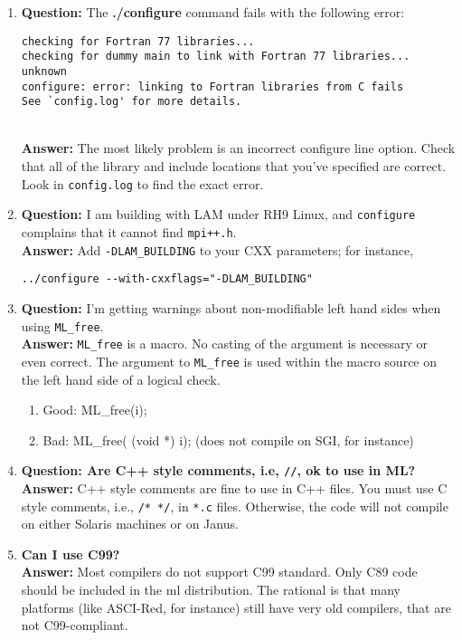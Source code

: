 \documentclass[10pt,letter,relax]{SANDreport}
\newcommand{\ML}     {{\sc ml }}
\begin{document}
\begin{enumerate}
\item {\bf Question:} The {\bf ./configure} command
fails with the following error:
\begin{verbatim}
checking for Fortran 77 libraries...
checking for dummy main to link with Fortran 77 libraries... unknown
configure: error: linking to Fortran libraries from C fails
See `config.log' for more details.
\end{verbatim}~\\
{\bf Answer:} The most likely problem is an incorrect configure line option.
Check that all of the library and include locations that you've specified are
correct.
Look in {\tt config.log} to find the exact error.
%
\item {\bf Question:} I am building with LAM under RH9 Linux, and
  {\tt configure} complains that it cannot find {\tt mpi++.h}.\\
{\bf Answer:} Add \verb!-DLAM_BUILDING! to your CXX parameters; for
instance,
\begin{verbatim}
../configure --with-cxxflags="-DLAM_BUILDING"
\end{verbatim}
%
\item {\bf Question:} I'm getting warnings about non-modifiable left hand sides
when using {\tt ML\_free}.\\
{\bf Answer:} {\tt ML\_free} is a macro.  No casting of the argument is necessary or
even correct.
The argument to {\tt ML\_free} is used within the
macro source on the left hand side of a logical check.
  \begin{enumerate}
    \item[ ] Good: ML\_free(i);
    \item[ ] Bad: ML\_free( (void *) i); (does not compile on SGI, for instance)
  \end{enumerate}
%
%
\item {\bf Question: Are C++ style comments, i.e, \verb!//!, ok to use in
ML?}\\
{\bf Answer:} C++ style comments are fine to use in C++ files.
You must use C style comments, i.e., \verb!/* */!, in \verb!*.c! files.
Otherwise, the code will not compile on either Solaris machines or on Janus.

\item {\bf Can I use C99?}\\
{\bf Answer:} Most compilers do not support C99 standard. Only C89 code should
  be included in the \ML distribution. The rational is that many
  platforms (like ASCI-Red, for instance) still have very old compilers,
  that are not C99-compliant.
\end{enumerate}
\end{document}
